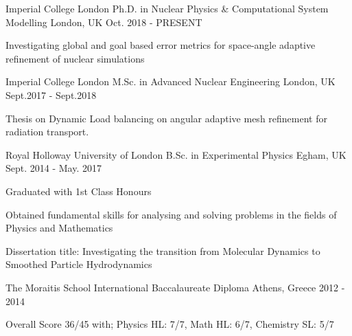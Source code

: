 \begin{cventries}
	\cventry
	{Imperial College London}
	{Ph.D. in Nuclear Physics \& Computational System Modelling}
	{London, UK}
	{Oct. 2018 - PRESENT}
	{
		\begin{cvitems}
			\item {Investigating global and goal based error metrics for
			            space-angle adaptive refinement of nuclear simulations}
		\end{cvitems}
	}
	\cventry
	{Imperial College London}
	{M.Sc. in Advanced Nuclear Engineering}
	{London, UK}
	{Sept.2017 - Sept.2018}
	{
		\begin{cvitems}
			\item {Thesis on Dynamic Load balancing on angular adaptive mesh refinement for radiation transport.}
		\end{cvitems}
	}

	\cventry
	{Royal Holloway University of London}
	{B.Sc. in Experimental Physics}
	{Egham, UK}
	{Sept. 2014 - May. 2017}
	{
		\begin{cvitems}
			\item {Graduated with 1st Class Honours}
			\item {Obtained fundamental skills for analysing and solving
			            problems in the fields of Physics and Mathematics}
			\item {Dissertation title: Investigating the transition from
			            Molecular Dynamics to Smoothed Particle Hydrodynamics}
		\end{cvitems}
	}

	\cventry
	{The Moraitis School}
	{International Baccalaureate Diploma}
	{Athens, Greece}
	{2012 - 2014}
	{
		\begin{cvitems}
			\item {Overall Score 36/45 with; Physics HL: 7/7, Math HL: 6/7, Chemistry SL: 5/7}
		\end{cvitems}
	}

\end{cventries}
